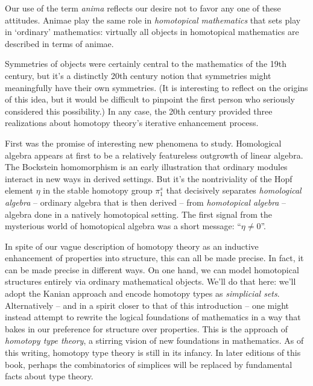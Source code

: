 Our use of the term \emph{anima} reflects our desire not to favor any one of these attitudes.
Animae play the same role in \emph{homotopical mathematics} that sets play in `ordinary' mathematics:
virtually all objects in homotopical mathematics are described in terms of animae.

Symmetries of objects were certainly central to the mathematics of the 19th century, but
it's a distinctly 20th century notion that symmetries might meaningfully have their own symmetries.
(It is interesting to reflect on the origins of this idea, but
it would be difficult to pinpoint the first person who seriously considered this possibility.)
In any case, the 20th century provided three realizations about homotopy theory's iterative enhancement process.

First was the promise of interesting new phenomena to study.
Homological algebra appears at first to be a relatively featureless outgrowth of linear algebra.
The Bockstein homomorphism is an early illustration that ordinary modules interact in new ways in derived settings.
But it's the nontriviality of the Hopf element $\eta$ in the stable homotopy group $\pi^s_1$ that decisively separates \emph{homological algebra} -- ordinary algebra that is then derived -- from \emph{homotopical algebra} -- algebra done in a natively homotopical setting.
The first signal from the mysterious world of homotopical algebra was a short message: \enquote{$\eta \neq 0$}.

In spite of our vague description of homotopy theory as an inductive enhancement of properties into structure,
this can all be made precise.
In fact, it can be made precise in different ways.
On one hand, we can model homotopical structures entirely via ordinary mathematical objects.
We'll do that here: we'll adopt the Kanian approach and encode homotopy types as \emph{simplicial sets}.
Alternatively -- and in a spirit closer to that of this introduction -- one might instead attempt to rewrite the logical foundations of mathematics in a way that bakes in our preference for structure over properties.
This is the approach of \emph{homotopy type theory}, a stirring vision of new foundations in mathematics.
As of this writing, homotopy type theory is still in its infancy.
In later editions of this book, perhaps the combinatorics of simplices will be replaced by fundamental facts about type theory.

